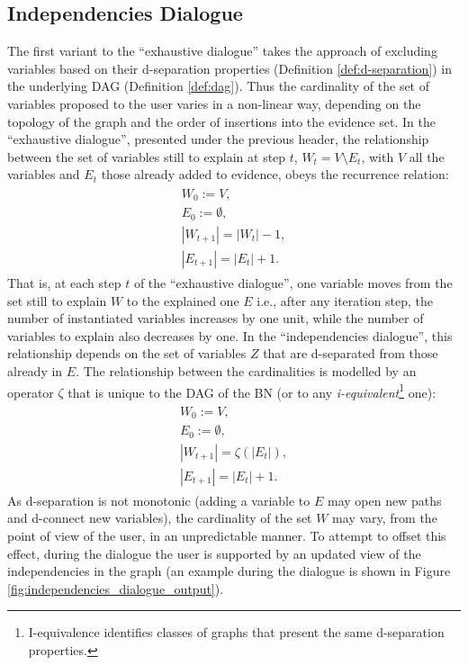 \subsection{Independencies Dialogue} \label{subsec:results-independencies-dialogue}
The first variant to the \enquote{exhaustive dialogue} takes the approach of excluding variables based on their d-separation properties (Definition \ref{def:d-separation}) in the underlying DAG (Definition \ref{def:dag}).
Thus the cardinality of the set of variables proposed to the user varies in a non-linear way, depending on the topology of the graph and the order of insertions into the evidence set.
In the \enquote{exhaustive dialogue}, presented under the previous header, the relationship between the set of variables still to explain at step $t$, $W_t = V \setminus E_t$, with $V$ all the variables and $E_t$ those already added to evidence, obeys the recurrence relation:
\begin{align}
\begin{split}
		W_0 := V, \\
	E_0 := \emptyset, \\
	|W_{t+1}| = |W_t| - 1, \\
	|E_{t+1}| = |E_t| + 1.
\end{split}
\end{align}
That is, at each step $t$ of the \enquote{exhaustive dialogue}, one variable moves from the set still to explain $W$ to the explained one $E$ i.e., after any iteration step, the number of instantiated variables increases by one unit, while the number of variables to explain also decreases by one.
In the \enquote{independencies dialogue}, this relationship depends on the set of variables $Z$ that are d-separated from those already in $E$.
The relationship between the cardinalities is modelled by an operator $\zeta$ that is unique to the DAG of the BN (or to any \textit{i-equivalent}\footnote{I-equivalence identifies classes of graphs that present the same d-separation properties.} one):
\begin{align}
\begin{split}
	W_0 := V, \\
	E_0 := \emptyset, \\
	|W_{t+1}| = \zeta(|E_t|), \\
	|E_{t+1}| = |E_t| + 1.
\end{split}
\end{align}
As d-separation is not monotonic (adding a variable to $E$ may open new paths and d-connect new variables), the cardinality of the set $W$ may vary, from the point of view of the user, in an unpredictable manner.
To attempt to offset this effect, during the dialogue the user is supported by an updated view of the independencies in the graph (an example during the dialogue is shown in Figure \ref{fig:independencies_dialogue_output}).

